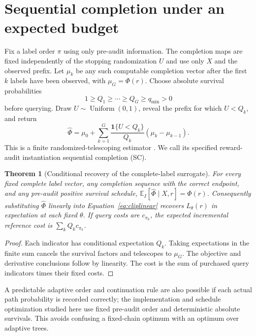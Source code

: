\documentclass[11pt]{article}
\newtheorem{theorem}{Theorem}
\newcommand{\E}{\mathbb E}
\newcommand{\ind}{\mathbf 1}
\begin{document}
\section{Sequential completion under an expected budget}\label{sec:method}
Fix a label order $\pi$ using only pre-audit information. The completion maps are fixed independently of the stopping randomization $U$ and use only $X$ and the observed prefix. Let $\mu_k$ be any such computable completion vector after the first $k$ labels have been observed, with $\mu_G=\Phi(r)$. Choose absolute survival probabilities
\[
 1\ge Q_1\ge\cdots\ge Q_G\ge q_{\min}>0
\]
before querying. Draw $U\sim\operatorname{Uniform}(0,1)$, reveal the prefix for which $U<Q_k$, and return
\begin{equation}\label{eq:rr}
 \widehat\Phi=\mu_0+\sum_{k=1}^G\frac{\ind\{U<Q_k\}}{Q_k}(\mu_k-\mu_{k-1}).
\end{equation}
This is a finite randomized-telescoping estimator \citep{rhee2015,beatson2019}. We call its specified reward-audit instantiation sequential completion (SC).

\begin{theorem}[Conditional recovery of the complete-label surrogate]\label{thm:rr}
For every fixed complete label vector, any completion sequence with the correct endpoint, and any pre-audit positive survival schedule, $\E_I[\widehat\Phi\mid X,r]=\Phi(r)$. Consequently substituting $\widehat\Phi$ linearly into Equation~\eqref{eq:cliplinear} recovers $L_\theta(r)$ in expectation at each fixed $\theta$. If query costs are $c_{\pi_k}$, the expected incremental reference cost is $\sum_k Q_k c_{\pi_k}$.
\end{theorem}
\begin{proof}
Each indicator has conditional expectation $Q_k$. Taking expectations in the finite sum cancels the survival factors and telescopes to $\mu_G$. The objective and derivative conclusions follow by linearity. The cost is the sum of purchased query indicators times their fixed costs.
\end{proof}
A predictable adaptive order and continuation rule are also possible if each actual path probability is recorded correctly; the implementation and schedule optimization studied here use fixed pre-audit order and deterministic absolute survivals. This avoids confusing a fixed-chain optimum with an optimum over adaptive trees.
\end{document}
